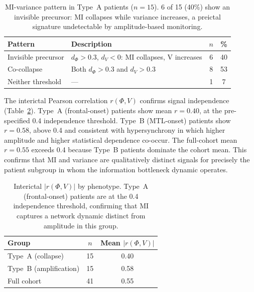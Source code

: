 \documentclass[final,5p,times,twocolumn]{elsarticle}
\begin{document}
\begin{table}[t]
  \centering
  \caption{MI-variance pattern in Type~A patients ($n = 15$).
           6 of 15 (40\%) show an invisible precursor: MI collapses
           while variance increases, a preictal signature undetectable
           by amplitude-based monitoring.}
  \label{tab:phase3}
  \begin{tabular}{llcc}
    \toprule
    Pattern & Description & $n$ & \% \\
    \midrule
    Invisible precursor &
      $d_\Phi > 0.3$, $d_V < 0$: MI collapses, V increases &
      6 & 40 \\
    Co-collapse &
      Both $d_\Phi > 0.3$ and $d_V > 0.3$ &
      8 & 53 \\
    Neither threshold &
      --- &
      1 & 7 \\
    \bottomrule
  \end{tabular}
\end{table}

The interictal Pearson correlation $r(\Phi, V)$ confirms signal
independence (Table~\ref{tab:decorrelation}).
%
Type~A (frontal-onset) patients show mean $r = 0.40$, at the
pre-specified 0.4 independence threshold.
%
Type~B (MTL-onset) patients show $r = 0.58$, above 0.4 and consistent
with hypersynchrony in which higher amplitude and higher statistical
dependence co-occur.
%
The full-cohort mean $r = 0.55$ exceeds 0.4 because Type~B patients
dominate the cohort mean.
%
This confirms that MI and variance are qualitatively distinct signals
for precisely the patient subgroup in whom the information bottleneck
dynamic operates.

\begin{table}[t]
  \centering
  \caption{Interictal $|r(\Phi, V)|$ by phenotype.
           Type~A (frontal-onset) patients are at the 0.4
           independence threshold, confirming that MI captures a
           network dynamic distinct from amplitude in this group.}
  \label{tab:decorrelation}
  \begin{tabular}{lcc}
    \toprule
    Group & $n$ & Mean $|r(\Phi, V)|$ \\
    \midrule
    Type~A (collapse)       & 15 & 0.40 \\
    Type~B (amplification)  & 15 & 0.58 \\
    Full cohort             & 41 & 0.55 \\
    \bottomrule
  \end{tabular}
\end{table}
\end{document}
